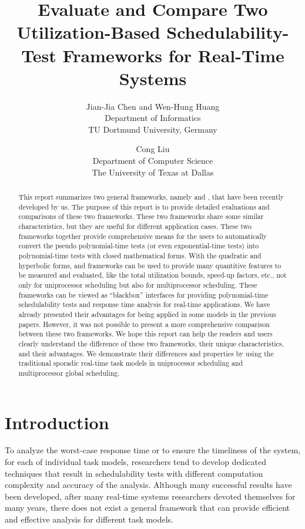 \documentclass[10pt,conference]{IEEEtran}
\title{\huge Evaluate and Compare Two Utilization-Based
  Schedulability-Test Frameworks for Real-Time Systems}
\author{
    Jian-Jia Chen and Wen-Hung Huang\\
    Department of Informatics\\
    TU Dortmund University, Germany
    \and
    Cong Liu\\
    Department of Computer Science\\
    The University of Texas at Dallas
}
\newcommand{\frameworkkq}[1]{}
\newcommand{\frameworkku}[1]{}
\begin{document}
\maketitle
\thispagestyle{plain}

\begin{abstract}
  This report summarizes two general frameworks, namely \frameworkkq{}
  and \frameworkku{}, that have been recently developed by us. The
  purpose of this report is to provide detailed evaluations and
  comparisons of these two frameworks. These two frameworks share some
  similar characteristics, but they are useful for different
  application cases.  These two frameworks together provide
  comprehensive means for the users to automatically convert the
  pseudo polynomial-time tests (or even exponential-time tests) into
  polynomial-time tests with closed mathematical forms.  With the
  quadratic and hyperbolic forms, \frameworkkq{} and \frameworkku{}
  frameworks can be used to provide many quantitive features to be
  measured and evaluated, like the total utilization bounds, speed-up factors, etc.,
  not only for uniprocessor scheduling but also for multiprocessor
  scheduling.  These frameworks can be viewed as ``blackbox''
  interfaces for providing polynomial-time schedulability tests and response time
  analysis for real-time applications.  We have already presented
  their advantages for being applied in some models in the previous
  papers.  However, it was not possible to present a more
  comprehensive comparison between these two frameworks. We hope this
  report can help the readers and users clearly understand the
  difference of these two frameworks, their unique characteristics,
  and their advantages. We demonstrate their differences and
  properties by using the traditional sporadic real-time task models
  in uniprocessor scheduling and multiprocessor global scheduling.
\end{abstract} 

\section{Introduction}
\label{sec:intro}

To analyze the worst-case response time or to ensure the timeliness of
the system, for each of individual task models, researchers tend to develop
dedicated techniques that result in schedulability tests with
different computation complexity and accuracy of the
analysis. Although many successful results have been developed, after
many real-time systems researchers devoted themselves for many years,
there does not exist a general framework that can provide  efficient and
effective analysis for different task models.
\end{document}
